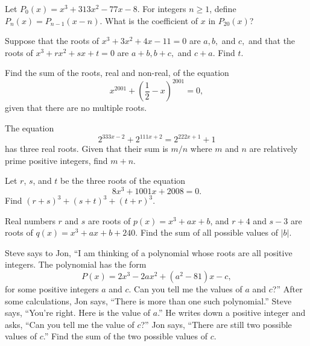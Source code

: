 \begin{question}[name={1993 AIME}]
    Let $P_0(x) = x^3 + 313x^2 - 77x - 8$. For integers $n \ge 1$, define $P_n(x) = P_{n - 1}(x - n)$. What is the coefficient of $x$ in $P_{20}(x)$?
\end{question}



\begin{question}[name={1996 AIME}]
    Suppose that the roots of $x^3+3x^2+4x-11=0$ are $a, b,$ and $c,$ and that the roots of $x^3+rx^2+sx+t=0$ are $a+b, b+c,$ and $c+a.$ Find $t$.
\end{question}


\begin{question}[name={2001 AIME}]
    Find the sum of the roots, real and non-real, of the equation \[x^{2001}+\left(\frac 12-x\right)^{2001}=0,\] given that there are no multiple roots.	
\end{question}

\begin{question}[name={2005 AIME}]
    The equation\[2^{333x-2}+2^{111x+2}=2^{222x+1}+1\]has three real roots. Given that their sum is $m/n$ where $m$ and $n$ are relatively prime positive integers, find $m+n$.
\end{question}

\begin{question}[name={2008 AIME}]
    Let $ r$, $ s$, and $ t$ be the three roots of the equation
    \[ 8x^3+1001x+2008=0.\]Find $ (r+s)^3+(s+t)^3+(t+r)^3$.
\end{question}


\begin{question}[name={2014 AIME}]
    Real numbers $r$ and $s$ are roots of $p(x)=x^3+ax+b$, and $r+4$ and $s-3$ are roots of $q(x)=x^3+ax+b+240$. Find the sum of all possible values of $|b|$.	
\end{question}

\begin{question}[name={2015 AIME}]
    Steve says to Jon, ``I am thinking of a polynomial whose roots are all positive integers. The polynomial has the form \[P(x)=2x^3-2ax^2+(a^2-81)x-c,\] for some positive integers $a$ and $c$. Can you tell me the values of $a$ and $c$?'' After some calculations, Jon says, ``There is more than one such polynomial.'' Steve says, ``You're right. Here is the value of $a$.'' He writes down a positive integer and asks, ``Can you tell me the value of $c$?'' Jon says, ``There are still two possible values of $c$.'' Find the sum of the two possible values of $c$.
\end{question}

